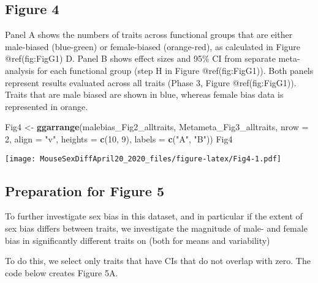 \documentclass[]{article}
\newenvironment{Shaded}{\begin{snugshade}}{\end{snugshade}}
\newcommand{\DataTypeTok}[1]{\textcolor[rgb]{0.13,0.29,0.53}{#1}}
\newcommand{\DecValTok}[1]{\textcolor[rgb]{0.00,0.00,0.81}{#1}}
\newcommand{\KeywordTok}[1]{\textcolor[rgb]{0.13,0.29,0.53}{\textbf{#1}}}
\newcommand{\NormalTok}[1]{#1}
\newcommand{\StringTok}[1]{\textcolor[rgb]{0.31,0.60,0.02}{#1}}
\begin{document}
\hypertarget{figure-4}{%
\subsection{Figure 4}\label{figure-4}}

Panel A shows the numbers of traits across functional groups that are
either male-biased (blue-green) or female-biased (orange-red), as
calculated in Figure @ref(fig:FigG1) D. Panel B shows effect sizes and
95\% CI from separate meta-analysis for each functional group (step H in
Figure @ref(fig:FigG1)). Both panels represent results evaluated across
all traits (Phase 3, Figure @ref(fig:FigG1)). Traits that are male
biased are shown in blue, whereas female bias data is represented in
orange.

\begin{Shaded}
\begin{Highlighting}[]
\NormalTok{Fig4 <-}\StringTok{ }\KeywordTok{ggarrange}\NormalTok{(malebias_Fig2_alltraits, Metameta_Fig3_alltraits, }\DataTypeTok{nrow =} \DecValTok{2}\NormalTok{, }\DataTypeTok{align =} \StringTok{"v"}\NormalTok{, }
    \DataTypeTok{heights =} \KeywordTok{c}\NormalTok{(}\DecValTok{10}\NormalTok{, }\DecValTok{9}\NormalTok{), }\DataTypeTok{labels =} \KeywordTok{c}\NormalTok{(}\StringTok{"A"}\NormalTok{, }\StringTok{"B"}\NormalTok{))}
\NormalTok{Fig4}
\end{Highlighting}
\end{Shaded}

\texttt{[image: MouseSexDiffApril20\_2020\_files/figure-latex/Fig4-1.pdf]}

\hypertarget{preparation-for-figure-5}{%
\subsection{Preparation for Figure 5}\label{preparation-for-figure-5}}

To further investigate sex bias in this dataset, and in particular if
the extent of sex bias differs between traits, we investigate the
magnitude of male- and female bias in significantly different traits on
(both for means and variability)

To do this, we select only traits that have CIs that do not overlap with
zero. The code below creates Figure 5A.
\end{document}
